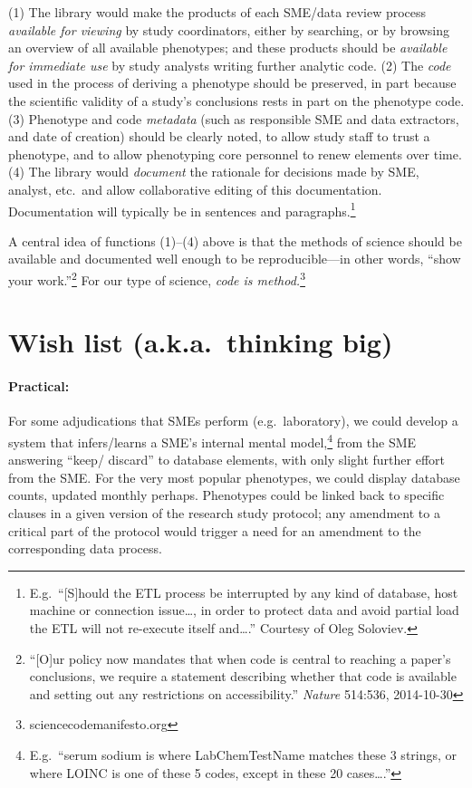 \documentclass{tufte-handout}
\begin{document}
(1) The library would make the products of each SME/data
review process \emph{available for viewing} by study coordinators,
either by searching, or by browsing an overview of all available
phenotypes; and these products should be
\emph{available for immediate use} by study analysts writing further
analytic code. (2) The \emph{code} used in the process of deriving a
phenotype should be preserved, in part because the scientific validity of a study's
conclusions rests in part on the phenotype code. (3) Phenotype and
code \emph{metadata} (such as responsible SME and data extractors, and
date of creation) should be clearly noted, to allow study staff to
trust a phenotype, and to allow phenotyping core personnel to renew
elements over time. (4) The library would \emph{document} the
rationale for decisions made by SME, analyst, etc.\ and allow
collaborative editing of this documentation. Documentation will
typically be in sentences and paragraphs.\footnote{E.g.\ ``[S]hould
  the ETL process be interrupted by any kind of database, host machine
  or connection issue\ldots{}, in order to protect data and avoid
  partial load the ETL will not re-execute itself and\ldots{}.'' Courtesy
  of Oleg Soloviev.}

\newpage

A central idea of functions (1)--(4) above is that the methods of
science should be available and documented well enough to be
reproducible---in other words, ``show your work.''\footnote{``[O]ur
  policy now mandates that when code is central to reaching a paper's
  conclusions, we require a statement describing whether that code is
  available and setting out any restrictions on accessibility.''
  \emph{Nature} 514:536, 2014-10-30} For our type of science,
\emph{code is method.}\footnote{sciencecodemanifesto.org} 

\section{Wish list (a.k.a.\ thinking big)}

\paragraph{Practical:}
For some adjudications that SMEs perform (e.g.\ laboratory), we could
develop a system that infers\slash learns a SME's internal mental
model,\footnote{E.g.\ ``serum sodium is where LabChemTestName matches
  these 3 strings, or where LOINC is one of these 5 codes, except in
  these 20 cases\ldots{}.''} from the SME answering ``keep\slash
discard'' to database elements, with only slight further effort from
the SME. For the very most popular phenotypes, we could display
database counts, updated monthly perhaps. Phenotypes could be linked
back to specific clauses in a given version of the research study
protocol; any amendment to a critical part of the protocol would
trigger a need for an amendment to the corresponding data process.
\end{document}
